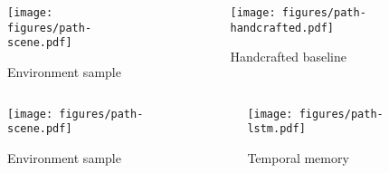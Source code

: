 \begin{frame}
    \begin{columns}
        \begin{column}{0.55\textwidth}
            \begin{figure}
                \centering
                \texttt{[image: figures/path-scene.pdf]}
                \par Environment sample
            \end{figure}
        \end{column}
        \begin{column}{0.5\textwidth}
            \begin{figure}
                \centering
                \texttt{[image: figures/path-handcrafted.pdf]}
                \par Handcrafted baseline
            \end{figure}
        \end{column}
    \end{columns}
\end{frame}

\begin{frame}
    \begin{columns}
        \begin{column}{0.55\textwidth}
            \begin{figure}
                \centering
                \texttt{[image: figures/path-scene.pdf]}
                \par Environment sample
            \end{figure}
        \end{column}
        \begin{column}{0.5\textwidth}
            \begin{figure}
                \centering
                \texttt{[image: figures/path-lstm.pdf]}
                \par Temporal memory
            \end{figure}
        \end{column}
    \end{columns}
\end{frame}

